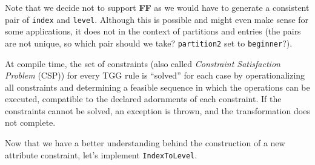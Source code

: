Note that we decide not to support \textbf{FF} as we would have to generate a consistent pair of \texttt{index} and \texttt{level}. Although this is possible
and might even make sense for some applications, it does not in the context of partitions and entries (the pairs are not unique, so which pair should we
take? \texttt{partition2} set to \texttt{beginner}?).

At compile time, the set of constraints (also called \emph{Constraint Satisfaction Problem} (CSP)) for every TGG rule is ``solved'' for each case by
operationalizing all constraints and determining a feasible sequence in which the operations can be executed, compatible to the declared adornments of each
constraint. If the constraints cannot be solved, an exception is thrown, and the transformation does not complete.

Now that we have a better understanding behind the construction of a new attribute constraint, let's implement \texttt{IndexToLevel}.


